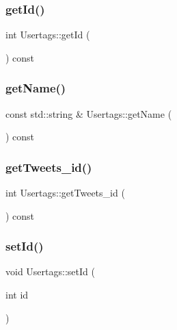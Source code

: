 \subsubsection{\texorpdfstring{get\+Id()}{getId()}}
{\footnotesize\ttfamily int Usertags\+::get\+Id (\begin{DoxyParamCaption}{ }\end{DoxyParamCaption}) const}

\mbox{\label{class_usertags_a87d86d442421ff1b440332dd33f9f6d4}} 
\subsubsection{\texorpdfstring{get\+Name()}{getName()}}
{\footnotesize\ttfamily const std\+::string \& Usertags\+::get\+Name (\begin{DoxyParamCaption}{ }\end{DoxyParamCaption}) const}

\mbox{\label{class_usertags_aa7b76271599fa091c6e8439c12331b48}} 
\subsubsection{\texorpdfstring{get\+Tweets\+\_\+id()}{getTweets\_id()}}
{\footnotesize\ttfamily int Usertags\+::get\+Tweets\+\_\+id (\begin{DoxyParamCaption}{ }\end{DoxyParamCaption}) const}

\mbox{\label{class_usertags_a3caae3ff620d10eb26dcb1340ca312ab}} 
\subsubsection{\texorpdfstring{set\+Id()}{setId()}}
{\footnotesize\ttfamily void Usertags\+::set\+Id (\begin{DoxyParamCaption}\item[{int}]{id }\end{DoxyParamCaption})}

\mbox{\label{class_usertags_a62bfb926a0387927385fa1d7baef2af3}} 
